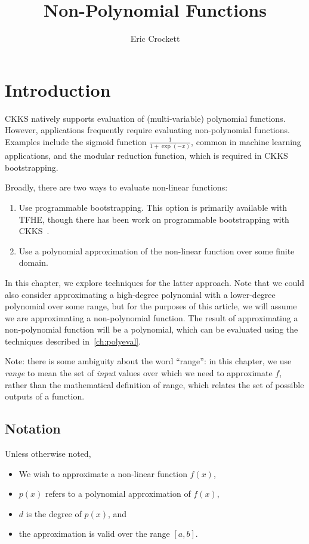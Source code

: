 \documentclass[../fheimpl.tex]{subfiles}
\author{Eric Crockett}
\begin{document}
    \ifcompileasbook
    \else
    \title{Non-Polynomial Functions}
    \hypersetup{pageanchor=false}
    \maketitle
    \listoffixmes
    \tableofcontents
    \compileasbooktrue
    \hypersetup{pageanchor=true}
    \fi
    
    \label{ch:polyapprox}
    
    \section{Introduction}
    CKKS natively supports evaluation of (multi-variable) polynomial functions. However, applications frequently require evaluating non-polynomial functions. Examples include the sigmoid function $\frac{1}{1+\exp(-x)}$, common in machine learning applications, and the modular reduction function, which is required in CKKS bootstrapping.
    
    Broadly, there are two ways to evaluate non-linear functions:
    \begin{enumerate}
        \item Use programmable bootstrapping. This option is primarily available with TFHE, though there has been work on programmable bootstrapping with CKKS~\cite{cryptoeprint:2024/1623}.
        
        \item Use a polynomial approximation of the non-linear function over some finite domain.
    \end{enumerate}
    
    In this chapter, we explore techniques for the latter approach. Note that we could also consider approximating a high-degree polynomial with a lower-degree polynomial over some range, but for the purposes of this article, we will assume we are approximating a non-polynomial function. The result of approximating a non-polynomial function will be a polynomial, which can be evaluated using the techniques described in~\cref{ch:polyeval}.
        
    Note: there is some ambiguity about the word ``range'': in this chapter, we use \emph{range} to mean the set of \emph{input} values over which we need to approximate $f$, rather than the mathematical definition of range, which relates the set of possible outputs of a function. 
    
    \subsection{Notation}
    Unless otherwise noted, 
    \begin{itemize}
        \item We wish to approximate a non-linear function $f(x)$,
        \item $p(x)$ refers to a polynomial approximation of $f(x)$,
        \item $d$ is the degree of $p(x)$, and
        \item the approximation is valid over the range $[a,b]$.
    \end{itemize}
    
\end{document}
